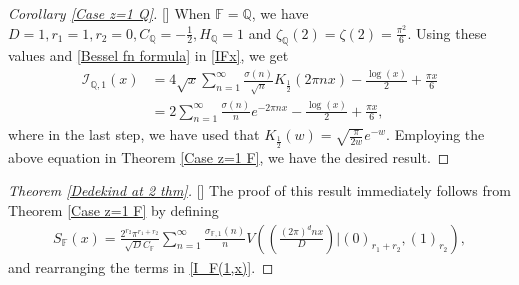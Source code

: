 \documentclass[12pt,reqno]{amsart}
\renewcommand{\(}{\left\(}
\renewcommand{\)}{\right\)}
\renewcommand{\[}{\left\[}
\renewcommand{\]}{\right\]}
\numberwithin{equation}{section}
\theoremstyle{plain}
\begin{document}
\begin{proof}[Corollary \rm{\ref{Case z=1 Q}}][]
When $\mathbb{F} = \mathbb{Q}$, we have $D = 1, r_1 = 1, r_2 = 0, C_\mathbb{Q} = -\frac{1}{2}, H_\mathbb{Q} = 1$ and $\zeta_\mathbb{Q}(2) = \zeta(2) = \frac{\pi^2}{6}$. Using these values and \eqref{Bessel fn formula} in \eqref{IFx}, we get
\begin{align*}
\mathcal{I}_{\mathbb{Q}, 1}(x) &= 4\sqrt{x}\sum_{n=1}^{\infty}\frac{\sigma(n)}{\sqrt{n}}K_{\frac{1}{2}}(2\pi nx) - \frac{\log(x)}{2} + \frac{\pi x}{6} \\
&= 2\sum_{n=1}^{\infty}\frac{\sigma(n)}{n}e^{-2\pi nx} - \frac{\log(x)}{2} + \frac{\pi x}{6},
\end{align*}
where in the last step, we have used that $K_{\frac{1}{2}}(w) = \sqrt{\frac{\pi}{2w}}e^{-w}$. Employing the above equation in Theorem \ref{Case z=1 F}, we have the desired result.
\end{proof}

\begin{proof}[Theorem \rm{\ref{Dedekind at 2 thm}}][]
The proof of this result immediately follows from Theorem \ref{Case z=1 F} by defining
\begin{align*}
S_\mathbb{F}(x) = \frac{2^{r_2}\pi^{r_1+r_2}}{\sqrt{D}C_\mathbb{F}}\sum_{n=1}^{\infty}\frac{\sigma_{\mathbb{F}, 1}(n)}{n}V\left(\left(\frac{(2\pi)^{d} n x}{D}\right)\bigg|\left(0\right)_{r_1 + r_2}, (1)_{r_2}\right),
\end{align*}
and rearranging the terms in \eqref{I_F(1,x)}.
\end{proof}
\end{document}
